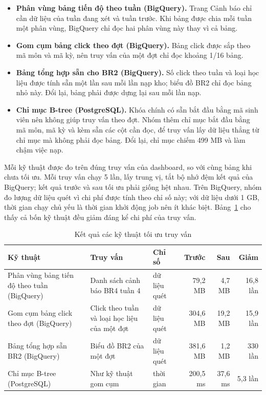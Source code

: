\begin{itemize}
  \item \textbf{Phân vùng bảng tiến độ theo tuần (BigQuery).} Trang Cảnh báo chỉ cần dữ liệu của
        tuần đang xét và tuần trước. Khi bảng được chia mỗi tuần một phân vùng, BigQuery chỉ đọc
        hai phân vùng này thay vì cả bảng.
  \item \textbf{Gom cụm bảng click theo đợt (BigQuery).} Bảng click được sắp theo mã môn và mã
        kỳ, nên truy vấn của một đợt chỉ đọc khoảng 1/16 bảng.
  \item \textbf{Bảng tổng hợp sẵn cho BR2 (BigQuery).} Số click theo tuần và loại học liệu được
        tính sẵn một lần sau mỗi lần nạp kho; biểu đồ BR2 chỉ đọc bảng nhỏ này. Đổi lại, bảng phải
        được dựng lại sau mỗi lần nạp.
  \item \textbf{Chỉ mục B-tree (PostgreSQL).} Khóa chính có sẵn bắt đầu bằng mã sinh viên nên
        không giúp truy vấn theo đợt. Nhóm thêm chỉ mục bắt đầu bằng mã môn, mã kỳ và kèm sẵn các
        cột cần đọc, để truy vấn lấy dữ liệu thẳng từ chỉ mục mà không phải đọc bảng. Đổi lại, chỉ
        mục chiếm 499 MB và làm chậm việc nạp.
\end{itemize}

Mỗi kỹ thuật được đo trên đúng truy vấn của dashboard, so với cùng bảng khi chưa tối ưu. Mỗi
truy vấn chạy 5 lần, lấy trung vị, tắt bộ nhớ đệm kết quả của BigQuery; kết quả trước và sau tối
ưu phải giống hệt nhau. Trên BigQuery, nhóm đo lượng dữ liệu quét vì chi phí được tính theo chỉ
số này; với dữ liệu dưới 1 GB, thời gian chạy chủ yếu là thời gian khởi động job nên ít khác biệt.
Bảng~\ref{tab:toi-uu} cho thấy cả bốn kỹ thuật đều giảm đáng kể chi phí của truy vấn.

\begin{table}[htbp]
\centering
\small
\begin{tabularx}{\textwidth}{|p{3.6cm}|X|l|r|r|r|}
\hline
\textbf{Kỹ thuật} & \textbf{Truy vấn} & \textbf{Chỉ số} & \textbf{Trước} & \textbf{Sau} & \textbf{Giảm} \\ \hline
Phân vùng bảng tiến độ theo tuần (BigQuery) & Danh sách cảnh báo BR4 tuần 4 & dữ liệu quét & 79,2 MB & 4,7 MB & 16,8 lần \\ \hline
Gom cụm bảng click theo đợt (BigQuery) & Click theo tuần và loại học liệu của một đợt & dữ liệu quét & 304,6 MB & 19,2 MB & 15,9 lần \\ \hline
Bảng tổng hợp sẵn BR2 (BigQuery) & Biểu đồ BR2 của một đợt & dữ liệu quét & 381,6 MB & 1,2 MB & 330 lần \\ \hline
Chỉ mục B-tree (PostgreSQL) & Như kỹ thuật gom cụm & thời gian & 200,5 ms & 37,6 ms & 5,3 lần \\ \hline
\end{tabularx}
\caption{Kết quả các kỹ thuật tối ưu truy vấn}
\label{tab:toi-uu}
\end{table}

